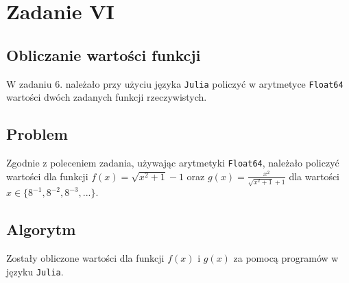 \documentclass{article}
\begin{document}
\section{Zadanie VI}
\subsection{Obliczanie wartości funkcji}
W zadaniu 6. należało przy użyciu języka \texttt{Julia} policzyć w arytmetyce \texttt{Float64} wartości dwóch zadanych funkcji rzeczywistych.

\subsection{Problem}
Zgodnie z poleceniem zadania, używając arytmetyki \texttt{Float64}, należało policzyć wartości dla funkcji $f(x) = \sqrt{x^{2} + 1} - 1$ oraz $g(x) = \frac{x^{2}}{\sqrt{x^{2} + 1} + 1}$ dla wartości $x \in \lbrace 8^{-1}, 8^{-2}, 8^{-3}, ... \rbrace$.

\subsection{Algorytm}
Zostały obliczone wartości dla funkcji $f(x)$ i $g(x)$ za pomocą programów w języku \texttt{Julia}.
\end{document}
